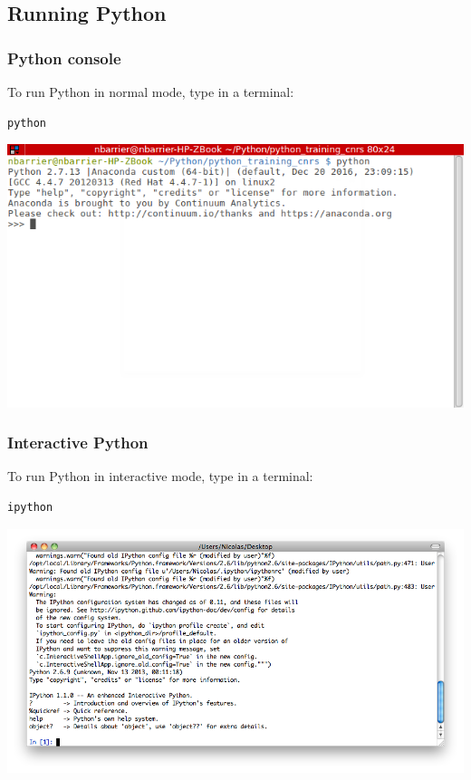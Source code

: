 \subsection{Running Python}

\begin{frame}[fragile]
\frametitle{Python console}
To run Python in normal mode, type in a terminal: \\
    \begin{lstlisting}[language=bash, basicstyle=\ttfamily\scriptsize]
python
    \end{lstlisting}
\vspace{-0.5em}
\begin{center}
\includegraphics[scale=0.5]{figs/console.png}
\end{center}
\vspace{-2em}
\end{frame}

\begin{frame}[fragile]
\frametitle{Interactive Python}
To run Python in interactive mode, type in a terminal: \\
    \begin{lstlisting}[language=bash, basicstyle=\ttfamily\scriptsize]
ipython 
    \end{lstlisting}
\vspace{-0.5em}
\begin{center}
\includegraphics[scale=0.35]{figs/ipython.png}
\end{center}
\vspace{-2em}
\end{frame}

